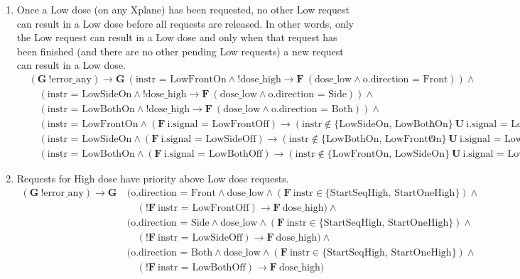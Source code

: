 \documentclass[a4paper,10pt]{article}
\newcommand{\LTLG}{\mathbf{G~}}
\newcommand{\LTLF}{\mathbf{F~}}
\newcommand{\LTLU}{\mathbf{~U~}}
\newcommand{\imply}{\rightarrow}
\newcommand{\doselow}{\textrm{dose\_low}}
\newcommand{\dosehigh}{\textrm{dose\_high}}
\newcommand{\errorany}{\textrm{error\_any}}
\begin{document}
\begin{enumerate}
		\item Once a Low dose (on any Xplane) has been requested, no other Low request can result in a Low dose before all requests are released. In other words, only the Low request can result in a Low dose and only when that request has been finished (and there are no other pending Low requests) a new request can result in a Low dose.
			\begin{align*}
				&(\LTLG !\errorany) \imply \LTLG (\textrm{instr = LowFrontOn} \land !\dosehigh \imply \LTLF (\doselow \land \textrm{o.direction = Front})) \land \\
				&	\hspace{1em}(\textrm{instr = LowSideOn} \land !\dosehigh \imply \LTLF (\doselow \land \textrm{o.direction = Side})) \land \\
				&	\hspace{1em}(\textrm{instr = LowBothOn} \land !\dosehigh \imply \LTLF (\doselow \land \textrm{o.direction = Both})) \land \\
				&	\hspace{1em}(\textrm{instr = LowFrontOn} \land (\LTLF \textrm{i.signal = LowFrontOff}) \imply (\textrm{instr} \notin \{\textrm{LowSideOn, LowBothOn}\} \LTLU \textrm{i.signal = LowFrontOff})) \land \\
				&	\hspace{1em}(\textrm{instr = LowSideOn} \land (\LTLF \textrm{i.signal = LowSideOff}) \imply (\textrm{instr} \notin \{\textrm{LowBothOn, LowFrontOn}\} \LTLU \textrm{i.signal = LowSideOff})) \land \\
				&	\hspace{1em}(\textrm{instr = LowBothOn} \land (\LTLF \textrm{i.signal = LowBothOff}) \imply (\textrm{instr} \notin \{\textrm{LowFrontOn, LowSideOn}\} \LTLU \textrm{i.signal = LowBothOff}))
			\end{align*}

		\item Requests for High dose have priority above Low dose requests.
			\begin{align*}
				(\LTLG !\errorany) \imply \LTLG &(\textrm{o.direction = Front} \land \doselow \land (\LTLF \textrm{instr} \in \{\textrm{StartSeqHigh, StartOneHigh}\}) \land \\
					&	\hspace{1em}(!\LTLF \textrm{instr = LowFrontOff}) \imply \LTLF \dosehigh) \land \\
					&(\textrm{o.direction = Side} \land \doselow \land (\LTLF \textrm{instr} \in \{\textrm{StartSeqHigh, StartOneHigh}\}) \land \\
					&	\hspace{1em}(!\LTLF \textrm{instr = LowSideOff}) \imply \LTLF \dosehigh) \land \\
					&(\textrm{o.direction = Both} \land \doselow \land (\LTLF \textrm{instr} \in \{\textrm{StartSeqHigh, StartOneHigh}\}) \land \\
					&	\hspace{1em}(!\LTLF \textrm{instr = LowBothOff}) \imply \LTLF \dosehigh)
			\end{align*}


\end{enumerate}
\end{document}
